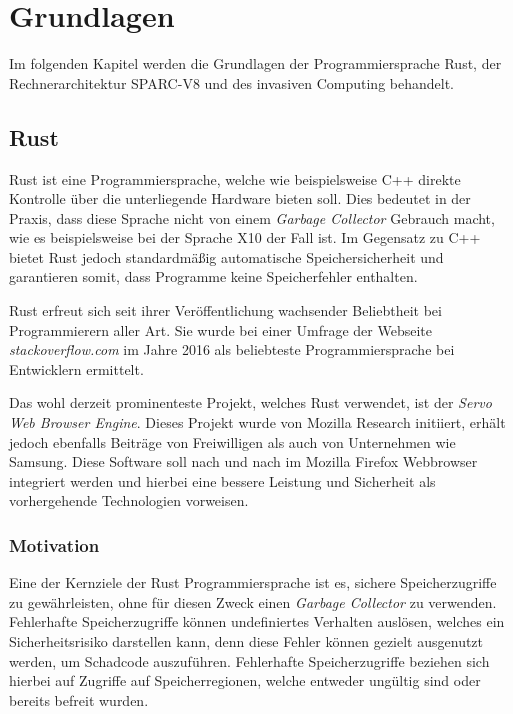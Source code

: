 \chapter{Grundlagen}\label{sec:basics}

Im folgenden Kapitel werden die Grundlagen der Programmiersprache Rust, der Rechnerarchitektur SPARC-V8 und des 
invasiven Computing behandelt.

\section{Rust}

Rust ist eine Programmiersprache, welche wie beispielsweise C++ direkte Kontrolle über die
unterliegende Hardware bieten soll. Dies bedeutet in der Praxis, dass diese Sprache nicht von einem
\textit{Garbage Collector} Gebrauch macht, wie es beispielsweise bei der Sprache X10 der Fall ist.
Im Gegensatz zu C++ bietet Rust jedoch
standardmäßig automatische Speichersicherheit und garantieren somit, dass Programme keine Speicherfehler enthalten.
\cite{theRustLanguage}

Rust erfreut sich seit ihrer Veröffentlichung wachsender Beliebtheit bei Programmierern aller Art. Sie wurde
bei einer Umfrage der Webseite \textit{stackoverflow.com} im Jahre 2016 als beliebteste Programmiersprache bei 
Entwicklern ermittelt\cite{stackoverflowSurvey}.

Das wohl derzeit prominenteste Projekt, welches Rust verwendet, ist der \textit{Servo Web Browser Engine}.
Dieses Projekt wurde von Mozilla Research initiiert, erhält jedoch ebenfalls Beiträge von Freiwilligen
als auch von Unternehmen wie Samsung.
Diese Software soll nach und nach im Mozilla Firefox Webbrowser integriert werden und hierbei eine bessere
Leistung und Sicherheit als vorhergehende Technologien vorweisen\cite{engineeringServo}.

\subsection{Motivation}

Eine der Kernziele der Rust Programmiersprache ist es, sichere Speicherzugriffe zu gewährleisten, ohne
für diesen Zweck einen \textit{Garbage Collector} zu verwenden. Fehlerhafte Speicherzugriffe können undefiniertes
Verhalten auslösen, welches ein Sicherheitsrisiko darstellen kann, denn diese Fehler können gezielt ausgenutzt
werden, um Schadcode auszuführen. Fehlerhafte Speicherzugriffe beziehen sich hierbei auf Zugriffe auf
Speicherregionen, welche entweder ungültig sind oder bereits befreit wurden.\cite{engineeringServo}\cite{undefinedBehaviour}

